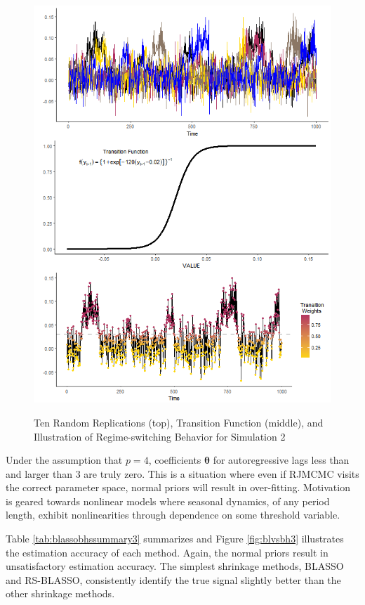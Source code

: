 \begin{figure}
	\centering
	\caption{Ten Random Replications (top), Transition Function (middle), and Illustration of Regime-switching Behavior  for Simulation 2}
	\includegraphics[scale=.7]{sim2plots}
	\label{fig:sim2plots}
\end{figure}

 Under the assumption that $p=4$, coefficients  $\bm{\theta}$ for autoregressive lags less than and larger than 3 are truly zero. This is a situation where even if RJMCMC visits the correct parameter space, normal priors will result in over-fitting. Motivation is geared towards nonlinear models where seasonal dynamics, of any period length, exhibit nonlinearities through dependence on some threshold variable.

Table \ref{tab:blassobhssummary3} summarizes and Figure \ref{fig:blvsbh3} illustrates the estimation accuracy of each method. Again, the normal priors result in unsatisfactory estimation accuracy. The simplest shrinkage methods, BLASSO and RS-BLASSO, consistently identify the true signal slightly better than the other shrinkage methods. 

